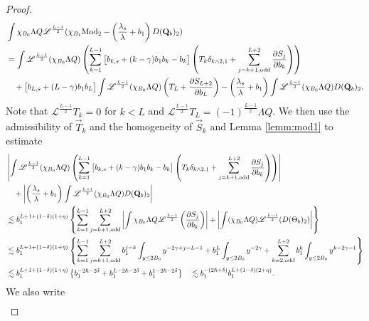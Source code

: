 \documentclass[11pt]{aims}
\theoremstyle{definition}
\numberwithin{equation}{section}
\begin{document}
\begin{proof}
\begin{align*}
& \int \chi_{B_0}\Lambda Q {\mathscr{L}}^{\frac{L - 1}2}(\chi_{B_1}\textup{Mod}_2  - \left(\frac{\lambda_s}{\lambda} + b_1\right) D(\mathbf{Q}_b)_2)\\
& = \int {\mathscr{L}}^{\frac{L-1}{2}}(\chi_{B_0}\Lambda Q) \left(\sum_{k = 1}^{L-1}\big[ b_{k, s} + (k - \gamma)b_1b_{k} - b_{k}\big] \left(T_k \delta_{k\wedge 2, 1} + \sum_{j = k + 1, \textup{odd}}^{L + 2} \frac{\partial S_j}{\partial b_k} \right) \right) \\
& \quad  +\big[b_{L,s}+ (L - \gamma)b_1b_L\big]\int {\mathscr{L}}^{\frac{L-1}{2}}(\chi_{B_0}\Lambda Q)\left(T_L + \frac{\partial S_{L +2}}{\partial b_L}\right)- \left(\frac{\lambda_s}{\lambda} + b_1\right)\int  {\mathscr{L}}^{\frac{L-1}{2}}(\chi_{B_0}\Lambda Q)D(\mathbf{Q}_b)_2.
\end{align*}
Note that ${\mathscr{L}}^{\frac{L - 1}{2}}T_k = 0$ for $k < L$ and ${\mathscr{L}}^{\frac{L-1}{2}}T_L = (-1)^{\frac{L - 1}{2}}\Lambda Q$. We then use the admissibility of $\vec T_k$ and the homogeneity of $\vec S_k$ and Lemma \ref{lemm:mod1} to estimate
\begin{align*}
&\left|\int {\mathscr{L}}^{\frac{L-1}{2}}(\chi_{B_0}\Lambda Q) \left(\sum_{k = 1}^{L-1}\big[ b_{k, s} + (k - \gamma)b_1b_{k} - b_{k}\big] \left(T_k \delta_{k\wedge 2, 1} + \sum_{j = k + 1, \textup{odd}}^{L + 2} \frac{\partial S_j}{\partial b_k} \right) \right) \right|\\
&\quad + \left|\left(\frac{\lambda_s}{\lambda} + b_1\right)\int  {\mathscr{L}}^{\frac{L-1}{2}}(\chi_{B_0}\Lambda Q)D(\mathbf{Q}_b)_2 \right|\\
& \lesssim b_1^{L+1 +(1 - \delta)(1 + \eta)}\left\{\sum_{k = 1}^{L - 1}\sum_{j = k+1, \textup{odd}}^{L+2} \left|\int \chi_{B_0}\Lambda Q {\mathscr{L}}^{\frac{L-1}{2}}\left(\frac{\partial S_j}{\partial b_k}\right)\right| + \left|\int  (\chi_{B_0}\Lambda Q) {\mathscr{L}}^{\frac{L-1}{2}}(D(\Theta_b)_2) \right|  \right\}\\
&\lesssim b_1^{L+1 +(1 - \delta)(1 + \eta)} \left\{\sum_{k = 1}^{L - 1}\sum_{j = k+1, \textup{odd}}^{L+2} b_1^{j - k}\int_{y \leq 2B_0}y^{-2\gamma + j - L -1} + b_1^L\int_{y \leq 2B_0}y^{-2\gamma} + \sum_{k = 2, \textup{odd}}^{L+2} b_1^k\int_{y \leq 2B_0}y^{k - 2\gamma - 1} \right\}\\
&\lesssim b_1^{L+1 +(1 - \delta)(1 + \eta)}\left\{b_1^{-2\hbar -2\delta} + b_1^{L - 2\hbar  - 2\delta} + b_1^{1 - 2\hbar - 2\delta}\right\} \quad \lesssim b_1^{-(2\hbar +\delta)}b_1^{L + (1 - \delta)(2 + \eta)}.
\end{align*}
We also write 
\begin{align*}

\end{align*}
\end{proof}
\end{document}
